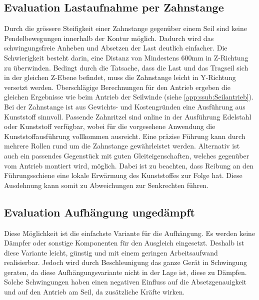 \documentclass[a4paper]{report}
\begin{document}
\subsection{Evaluation Lastaufnahme per Zahnstange}
\label{app:ssec:EvalLastZahn}
Durch die grössere Steifigkeit einer Zahnstange gegenüber einem Seil sind keine Pendelbewegungen innerhalb der Kontur möglich. Dadurch wird das schwingungsfreie Anheben und Absetzen der Last deutlich einfacher. Die Schwierigkeit besteht darin, eine Distanz von Mindestens 600mm in Z-Richtung zu überwinden. Bedingt durch die Tatsache, dass die Last und das Tragseil sich in der gleichen Z-Ebene befindet, muss die Zahnstange leicht in Y-Richtung versetzt werden. \newline
Überschlägige Berechnungen für den Antrieb ergeben die gleichen Ergebnisse wie beim Antrieb der Seilwinde (siehe \ref{app:ssub:Seilantrieb}). Bei der Zahnstange ist aus Gewichts- und Kostengründen eine Ausführung aus Kunststoff sinnvoll. Passende Zahnritzel sind online in der Ausführung Edelstahl oder Kunststoff verfügbar, wobei für die vorgesehene Anwendung die Kunststoffausführung vollkommen ausreicht. Eine präzise Führung kann durch mehrere Rollen rund um die Zahnstange gewährleistet werden. Alternativ ist auch ein passendes Gegenstück mit guten Gleiteigenschaften, welches gegenüber vom Antrieb montiert wird, möglich. Dabei ist zu beachten, dass Reibung an den Führungsschiene eine lokale Erwärmung des Kunststoffes zur Folge hat. Diese Ausdehnung kann somit zu Abweichungen zur Senkrechten führen.

\subsection{Evaluation Aufhängung ungedämpft}
\label{app:ssec:EvalAufhangUngedaempft}
Diese Möglichkeit ist die einfachste Variante für die Aufhängung. Es werden keine Dämpfer oder sonstige Komponenten für den Ausgleich eingesetzt. Deshalb ist diese Variante leicht, günstig und mit einem geringen Arbeitsaufwand realisierbar. Jedoch wird durch Beschleunigung das ganze Gerät in Schwingung geraten, da diese Aufhängungsvariante nicht in der Lage ist, diese zu Dämpfen. Solche Schwingungen haben einen negativen Einfluss auf die Absetzgenauigkeit und auf den Antrieb am Seil, da zusätzliche Kräfte wirken.
\end{document}
